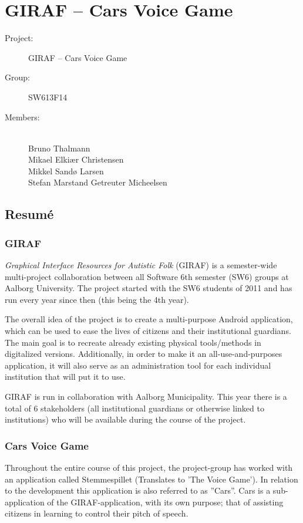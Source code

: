 \documentclass[a4paper,12pt,english]{article}
\begin{document}
\section*{GIRAF -- Cars Voice Game}

\begin{description}
\item[Project:] GIRAF -- Cars Voice Game
\item[Group:] SW613F14
\item[Members:] ~ \\
	Bruno Thalmann \\
	Mikael Elki\ae r Christensen \\
	Mikkel Sand\o{} Larsen \\
	Stefan Marstand Getreuter Micheelsen
\end{description}

\subsection*{Resum\'e}

\subsubsection*{GIRAF}
\textit{Graphical Interface Resources for Autistic Folk} (GIRAF) is a semester-wide multi-project collaboration between all Software 6th semester (SW6) groups at Aalborg University.
The project started with the SW6 students of 2011 and has run every year since then (this being the 4th year).

The overall idea of the project is to create a multi-purpose Android application, which can be used to ease the lives of citizens and their institutional guardians.
The main goal is to recreate already existing physical tools/methods in digitalized versions.
Additionally, in order to make it an all-use-and-purposes application, it will also serve as an administration tool for each individual institution that will put it to use.

GIRAF is run in collaboration with Aalborg Municipality.
This year there is a total of 6 stakeholders (all institutional guardians or otherwise linked to institutions) who will be available during the course of the project.

\subsubsection*{Cars Voice Game}
Throughout the entire course of this project, the project-group has worked with an application called Stemmespillet (Translates to 'The Voice Game').
In relation to the development this application is also referred to as ''Cars''.
Cars is a sub-application of the GIRAF-application, with its own purpose; that of assisting citizens in learning to control their pitch of speech.
\end{document}
